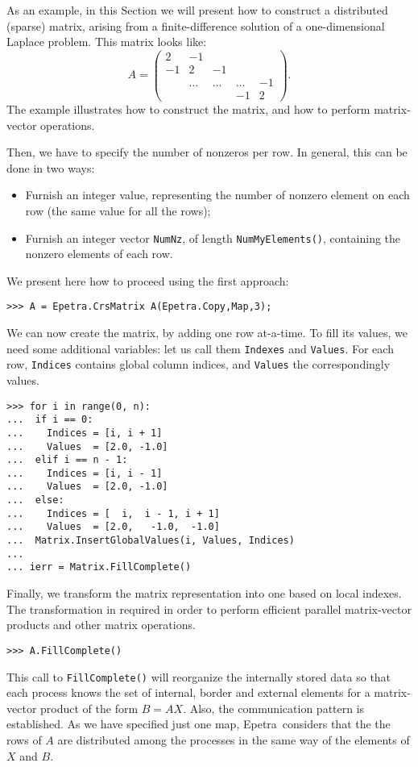 \documentclass[10pt,relax]{SANDreport}
\newcommand{\epetra}{{Epetra}}
\begin{document}
As an example, in this Section we will present how to construct a
distributed (sparse) matrix, arising from a finite-difference solution
of a one-dimensional Laplace problem. This matrix looks like:
\begin{equation*}
A = \begin{pmatrix}
 2 & -1 &     &   &    \\
-1 &  2     & -1     &        &    \\
   & \ldots & \ldots & \ldots & -1 \\
   &        &        & -1     & 2
\end{pmatrix}.
\end{equation*}
The example illustrates how to construct the matrix,
and how to perform matrix-vector operations.

Then, we have to specify the number
of nonzeros per row. In general, this can be done in two ways:
\begin{itemize}
\item Furnish an integer value, representing the number of nonzero
  element on each row (the same value for all the rows);
\item Furnish an integer vector \verb!NumNz!, of length
  \verb!NumMyElements()!, containing the nonzero elements of each row.
\end{itemize}

We present here how to proceed using the first approach:
\begin{verbatim}
>>> A = Epetra.CrsMatrix A(Epetra.Copy,Map,3);
\end{verbatim}

We can now create the matrix, by adding one row at-a-time.
To fill its values, we
need some additional variables: let us call them \verb!Indexes! and
\verb!Values!. For each row, \verb!Indices! contains global column
indices, and \verb!Values! the correspondingly values.
\begin{verbatim}
>>> for i in range(0, n):
...  if i == 0:
...    Indices = [i, i + 1]
...    Values  = [2.0, -1.0]
...  elif i == n - 1:
...    Indices = [i, i - 1]
...    Values  = [2.0, -1.0]
...  else:
...    Indices = [  i,  i - 1, i + 1]
...    Values  = [2.0,   -1.0,  -1.0]
...  Matrix.InsertGlobalValues(i, Values, Indices)
...
... ierr = Matrix.FillComplete()
\end{verbatim}
Finally, we
transform the matrix representation into one based on local indexes. The
transformation in required in order to perform efficient parallel
matrix-vector products and other matrix operations.
\begin{verbatim}
>>> A.FillComplete()
\end{verbatim}
This call to \verb!FillComplete()! will reorganize the internally stored
data so that each process knows the set of internal, border and external
elements for a matrix-vector product of the form $B = AX$. Also, the
communication pattern is established. As we have specified just one map,
\epetra\ considers that the the rows of $A$ are distributed among the
processes in the same way of the elements of $X$ and $B$.
\end{document}

